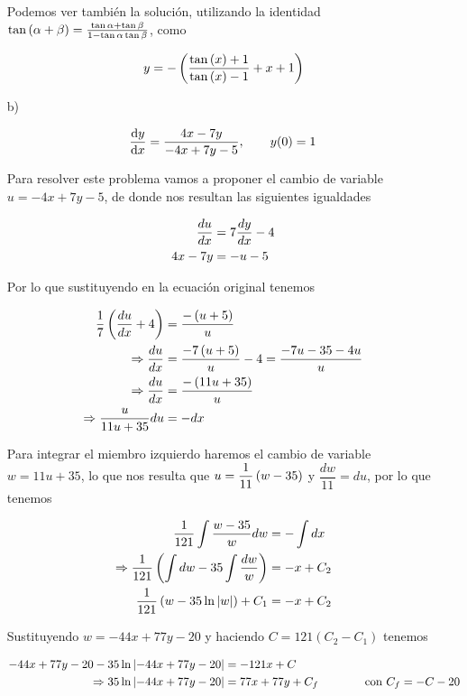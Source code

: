 \begin{enumerate}
Podemos ver también la  solución, utilizando la identidad $\tan\left( \alpha+\beta \right)=\frac{\tan\alpha+\tan\beta}{1-\tan\alpha\tan\beta}$,  como

\begin{align*}
    y=-\left( \dfrac{\tan\left( x \right)+1}{\tan\left( x \right)-1}+x+1 \right)
\end{align*}


\item[b)]

\begin{align*}
    \dv{y}{x} = \frac{4x-7y}{-4x+7y-5}, \qquad y(0)=1
\end{align*}

Para resolver este problema vamos a proponer el cambio de variable $u=-4x+7y-5$, de donde nos resultan las siguientes igualdades 

\begin{align*}
    \dfrac{du}{dx}&=7\dfrac{dy}{dx}-4\\
    4x-7y&=-u-5
\end{align*}

Por lo que sustituyendo en la ecuación original tenemos

\begin{align*}
    \dfrac{1}{7}\left( \dfrac{du}{dx}+4 \right)&=\dfrac{-\left( u+5 \right)}{u}\\
    \Rightarrow  \dfrac{du}{dx}&=\dfrac{-7\left( u+5 \right)}{u}-4=\dfrac{-7u-35-4u}{u}\\
    \Rightarrow  \dfrac{du}{dx}&=\dfrac{-\left( 11u+35 \right)}{u} \\ 
    \Rightarrow \dfrac{u}{11u+35}du&=-dx
\end{align*}

Para integrar el miembro izquierdo haremos el cambio de variable $w=11u+35$, lo que nos resulta que $u=\dfrac{1}{11}\left( w-35 \right)$ y $\dfrac{dw}{11}=du$, por lo que tenemos

\begin{align*}
    \dfrac{1}{121}\int\dfrac{w-35}{w}dw&=-\int dx \\ 
    \Rightarrow \dfrac{1}{121}\left( \int dw - 35 \int \dfrac{dw}{w}   \right)&=-x+C_2 \\ 
    \dfrac{1}{121}\left( w-35\ln\left| w \right| \right)+C_1&=-x+C_2
\end{align*}

Sustituyendo $w=-44x+77y-20$ y haciendo $C=121(C_2-C_1)$ tenemos

\begin{align*}
    -44x+77y-20-35\ln\left| -44x+77y-20 \right|&=-121x+C \\
    \Rightarrow 35\ln \left| -44x+77y-20 \right|&=77x+77y+C_f  ~~~~~~~~~~~~ \text{con $C_f=-C-20$} 
\end{align*}


\end{enumerate}
